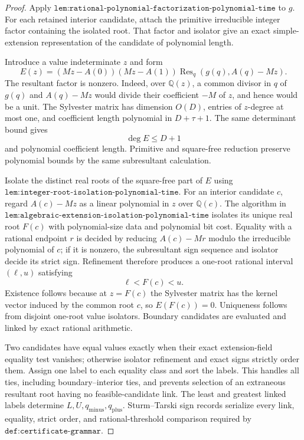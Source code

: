 \documentclass{article}
\begin{document}
\begin{proof}
Apply \(\texttt{lem:rational-polynomial-factorization-polynomial-time}\) to \(g\).  For each retained interior candidate, attach the primitive irreducible integer factor containing the isolated root.  That factor and isolator give an exact simple-extension representation of the candidate of polynomial length.

Introduce a value indeterminate \(z\) and form
\[
 E(z)=
 (Mz-A(0))(Mz-A(1))
 \operatorname{Res}_{q}\!\left(g(q),A(q)-Mz\right).
\]
The resultant factor is nonzero.  Indeed, over \(\mathbb Q(z)\), a common divisor in \(q\) of \(g(q)\) and \(A(q)-Mz\) would divide their coefficient \(-M\) of \(z\), and hence would be a unit.  The Sylvester matrix has dimension \(O(D)\), entries of \(z\)-degree at most one, and coefficient length polynomial in \(D+\tau+1\).  The same determinant bound gives
\[
 \deg E\leq D+1
\]
and polynomial coefficient length.  Primitive and square-free reduction preserve polynomial bounds by the same subresultant calculation.

Isolate the distinct real roots of the square-free part of \(E\) using \(\texttt{lem:integer-root-isolation-polynomial-time}\).  For an interior candidate \(c\), regard \(A(c)-Mz\) as a linear polynomial in \(z\) over \(\mathbb Q(c)\).  The algorithm in \(\texttt{lem:algebraic-extension-isolation-polynomial-time}\) isolates its unique real root \(F(c)\) with polynomial-size data and polynomial bit cost.  Equality with a rational endpoint \(r\) is decided by reducing \(A(c)-Mr\) modulo the irreducible polynomial of \(c\); if it is nonzero, the subresultant sign sequence and isolator decide its strict sign.  Refinement therefore produces a one-root rational interval \((\ell,u)\) satisfying
\[
 \ell<F(c)<u.
\]
Existence follows because at \(z=F(c)\) the Sylvester matrix has the kernel vector induced by the common root \(c\), so \(E(F(c))=0\).  Uniqueness follows from disjoint one-root value isolators.  Boundary candidates are evaluated and linked by exact rational arithmetic.

Two candidates have equal values exactly when their exact extension-field equality test vanishes; otherwise isolator refinement and exact signs strictly order them.  Assign one label to each equality class and sort the labels.  This handles all ties, including boundary--interior ties, and prevents selection of an extraneous resultant root having no feasible-candidate link.  The least and greatest linked labels determine \(L,U,q_{\mathrm{minus}},q_{\mathrm{plus}}\).  Sturm--Tarski sign records serialize every link, equality, strict order, and rational-threshold comparison required by \(\texttt{def:certificate-grammar}\).


\end{proof}
\end{document}
